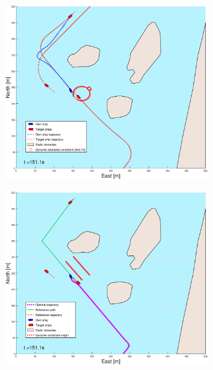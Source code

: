 \begin{figure}[ht]\ContinuedFloat
    \begin{subfigure}[b]{0.49\textwidth}
        \centering
        \includegraphics[width=\textwidth]{Images/Figures/Helloya_Rev/_Simple_0fig1_time=151}
    \end{subfigure}
    \hfill
    \begin{subfigure}[b]{0.499\textwidth}
        \centering
        \includegraphics[width=\textwidth]{Images/Figures/Helloya_Rev/_Simple_0fig999_time=151}

\end{subfigure}
\end{figure}
